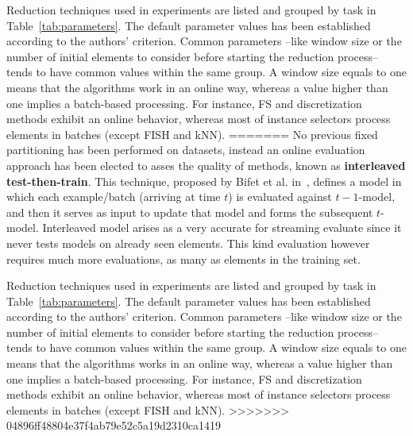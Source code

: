 \documentclass[preprint,12pt]{elsarticle}
\begin{document}
\begin{itemize}
Reduction techniques used in experiments are listed and grouped by task in Table~\ref{tab:parameters}. The default parameter values has been established according to the authors' criterion. Common parameters --like window size or the number of initial elements to consider before starting the reduction process-- tends to have common values within the same group. A window size equals to one means that the algorithms work in an online way, whereas a value higher than one implies a batch-based processing. For instance, FS and discretization methods exhibit an online behavior, whereas most of instance selectors process elements in batches (except FISH and kNN).
=======
No previous fixed partitioning has been performed on datasets, instead an online evaluation approach has been elected to asses the quality of methods, known as \textbf{interleaved test-then-train}. This technique, proposed by Bifet et al. in~\cite{bifet09}, defines a model in which each example/batch (arriving at time $t$) is evaluated against $t-1$-model, and then it serves as input to update that model and forms the subsequent $t$-model. Interleaved model arises as a very accurate for streaming evaluate since it never tests models on already seen elements. This kind evaluation however requires much more evaluations, as many as elements in the training set.

Reduction techniques used in experiments are listed and grouped by task in Table~\ref{tab:parameters}. The default parameter values has been established according to the authors' criterion. Common parameters --like window size or the number of initial elements to consider before starting the reduction process-- tends to have common values within the same group. A window size equals to one means that the algorithms works in an online way, whereas a value higher than one implies a batch-based processing. For instance, FS and discretization methods exhibit an online behavior, whereas most of instance selectors process elements in batches (except FISH and kNN).
>>>>>>> 04896ff48804e37f4ab79e52c5a19d2310ca1419


\end{itemize}
\end{document}
